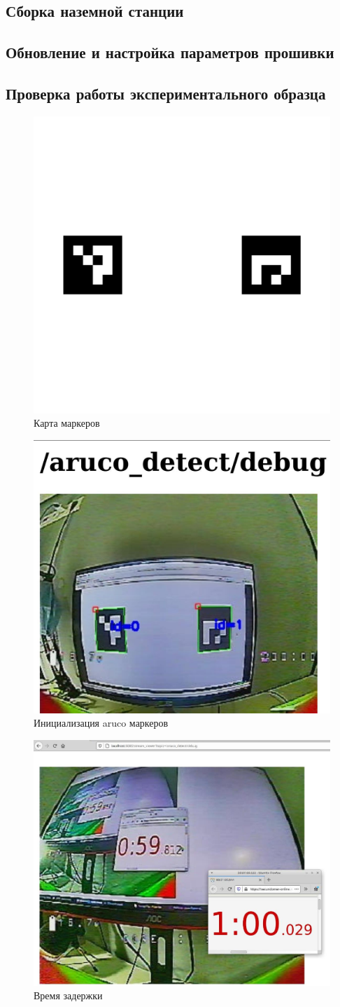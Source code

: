 \subsection{Сборка наземной станции}

\subsection{Обновление и настройка параметров прошивки}

\subsection{Проверка работы экспериментального образца}
\begin{figure}[H]
	\centering
	\includegraphics[width=0.5\linewidth]{pics/map}
	\caption{Карта маркеров
	}
	\label{fig:map}
\end{figure}

\begin{figure}[H]
	\centering
	\includegraphics[width=0.5\linewidth]{pics/aruco_detect}
	\caption{Инициализация aruco маркеров
	}
	\label{fig:aruco_detect}
\end{figure}

\begin{figure}[H]
	\centering
	\includegraphics[width=0.5\linewidth]{pics/time}
	\caption{Время задержки%
	}
	\label{fig:time}
\end{figure}
